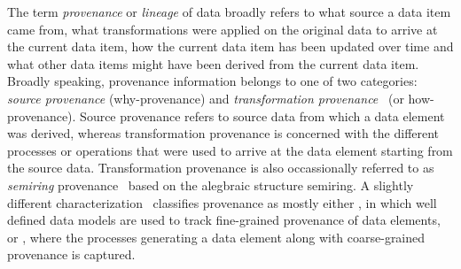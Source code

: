 
% 
% 
% 
% 
% 
% 

The term \textit{provenance} or \textit{lineage} of data broadly refers to what source a data item came from, what transformations were applied on the original data to arrive at the current data item, how the current data item has been updated over time and what other data items might have been derived from the current data item. Broadly speaking, provenance information belongs to one of two categories: \textit{source provenance} (why-provenance) and \textit{transformation provenance}~\cite{tan_ieee04} (or how-provenance). Source provenance refers to source data from which a data element was derived, whereas transformation provenance is concerned with the different processes or operations that were used to arrive at the data element starting from the source data. Transformation provenance is also occassionally referred to as \textit{semiring} provenance~\cite{semiring_pods07} based on the alegbraic structure semiring. A slightly different characterization~\cite{ikeda2010panda} classifies provenance as mostly either , in which well defined data models are used to track fine-grained provenance of data elements, or , where the processes generating a data element along with coarse-grained provenance is captured. 

